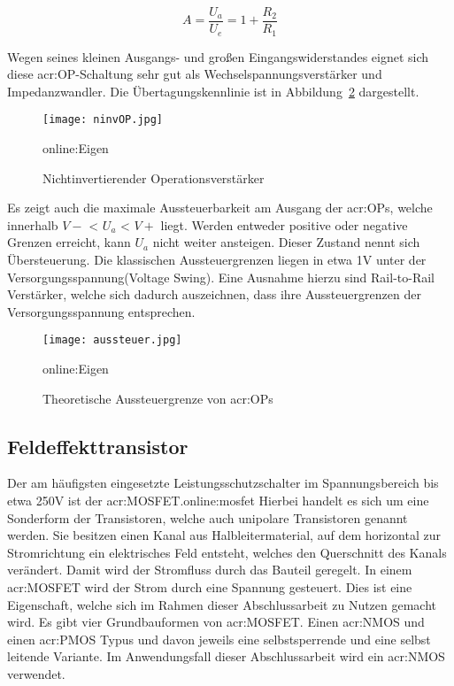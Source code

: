 \begin{equation}
	\label{equ:bsp1}
	A = \frac{U_{a}}{U_{e}} = 1+ \frac{R_{2}}{R_{1}}
\end{equation}

Wegen seines kleinen Ausgangs- und großen Eingangswiderstandes eignet sich diese \gls{acr:OP}-Schaltung sehr gut als  Wechselspannungsverstärker und Impedanzwandler. Die Übertagungskennlinie ist in Abbildung~\ref{fig:aussteuer} dargestellt. 

\begin{figure}[H]
	\centering
	\texttt{[image: ninvOP.jpg]}
	\caption[Nichtinvertierender Operationsverstärker]{Nichtinvertierender Operationsverstärker} 
	\gls{online:Eigen}
	\label{fig:invOP}
\end{figure}

Es zeigt auch die maximale Aussteuerbarkeit am Ausgang der \gls{acr:OP}s, welche innerhalb $V-$ < $U_{a}$ < $V+$ liegt. Werden entweder positive oder negative Grenzen erreicht, kann $U_{a}$ nicht weiter ansteigen. Dieser Zustand nennt sich Übersteuerung. Die klassischen Aussteuergrenzen liegen in etwa 1V unter der Versorgungsspannung(Voltage Swing).\cite{OP} Eine Ausnahme hierzu sind Rail-to-Rail Verstärker, welche sich dadurch auszeichnen, dass ihre Aussteuergrenzen der Versorgungsspannung entsprechen. 

\begin{figure}[H]
	\centering
	\texttt{[image: aussteuer.jpg]}
	\caption[Theoretische Aussteuergrenze von \gls{acr:OP}s]{Theoretische Aussteuergrenze von \gls{acr:OP}s} 
	\gls{online:Eigen}
	\label{fig:aussteuer}
\end{figure} 

\newpage
\subsection{Feldeffekttransistor}
\label{subsec:mosfet}
Der am häufigsten eingesetzte Leistungsschutzschalter im Spannungsbereich bis etwa 250V ist der \gls{acr:MOSFET}.\gls{online:mosfet} Hierbei handelt es sich um eine Sonderform der Transistoren, welche auch unipolare Transistoren genannt werden. Sie besitzen einen Kanal aus Halbleitermaterial, auf dem horizontal zur Stromrichtung ein elektrisches Feld entsteht, welches den Querschnitt des Kanals verändert. Damit wird der Stromfluss durch das Bauteil geregelt. In einem \gls{acr:MOSFET} wird der Strom durch eine Spannung gesteuert. Dies ist eine Eigenschaft, welche sich im Rahmen dieser Abschlussarbeit zu Nutzen gemacht wird. Es gibt vier Grundbauformen von \gls{acr:MOSFET}. Einen \gls{acr:NMOS} und einen \gls{acr:PMOS} Typus und davon jeweils eine selbstsperrende und eine selbst leitende Variante. Im Anwendungsfall dieser Abschlussarbeit wird ein \gls{acr:NMOS} verwendet.\cite{heringElektrotechnikUndElektronik2018} 


